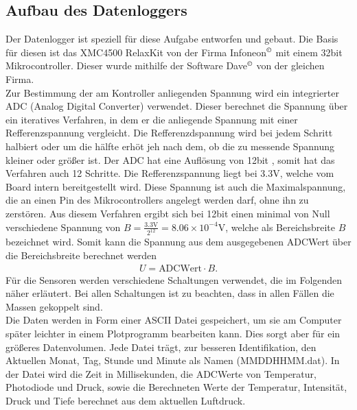 \documentclass[12pt,a4paper,titlepage,headinclude,bibtotoc]{scrartcl}
\begin{document}
\subsection{Aufbau des Datenloggers}
Der Datenlogger ist speziell für diese Aufgabe entworfen und gebaut.
Die Basis für diesen ist das XMC4500 RelaxKit von der Firma Infoneon$^\copyright$ mit einem 32bit Mikrocontroller.
Dieser wurde mithilfe der Software Dave$^\copyright$ von der gleichen Firma.\\
Zur Bestimmung der am Kontroller anliegenden Spannung wird ein integrierter ADC (Analog Digital Converter) verwendet.
Dieser berechnet die Spannung über ein iteratives Verfahren, in dem er die anliegende Spannung mit einer Refferenzspannung vergleicht.
Die Refferenzdspannung wird bei jedem Schritt halbiert oder um die hälfte erhöt jeh nach dem, ob die zu messende Spannung kleiner oder größer ist.
Der ADC hat eine Auflösung von 12bit %
, somit hat das Verfahren auch 12 Schritte.
Die Refferenzspannung liegt bei 3.3\si{\volt}, welche vom Board intern bereitgestellt wird.
Diese Spannung ist auch die Maximalspannung, die an einen Pin des Mikrocontrollers angelegt werden darf, ohne ihn zu zerstören.
Aus diesem Verfahren ergibt sich bei 12bit einen minimal von Null verschiedene Spannung von $B=\frac{3.3\si{\volt}}{2^{12}}=8.06\times10^{-4}\si{\volt}$, welche als Bereichsbreite $B$ bezeichnet wird.
Somit kann die Spannung aus dem ausgegebenen ADCWert über die Bereichsbreite berechnet werden
\begin{align}
	U=\text{ADCWert}\cdot B.\label{eq:ADCwert}
\end{align}
Für die Sensoren werden verschiedene Schaltungen verwendet, die im Folgenden näher erläutert.
Bei allen Schaltungen ist zu beachten, dass in allen Fällen die Massen gekoppelt sind.\\
Die Daten werden in Form einer ASCII Datei gespeichert, um sie am Computer später leichter in einem Plotprogramm bearbeiten kann.
Dies sorgt aber für ein größeres Datenvolumen.
Jede Datei trägt, zur besseren Identifikation, den Aktuellen Monat, Tag, Stunde und Minute als Namen (MMDDHHMM.dat).
In der Datei wird die Zeit in Millisekunden, die ADCWerte von Temperatur, Photodiode und Druck, sowie die Berechneten Werte der Temperatur, Intensität, Druck und Tiefe berechnet aus dem aktuellen Luftdruck.
\end{document}
